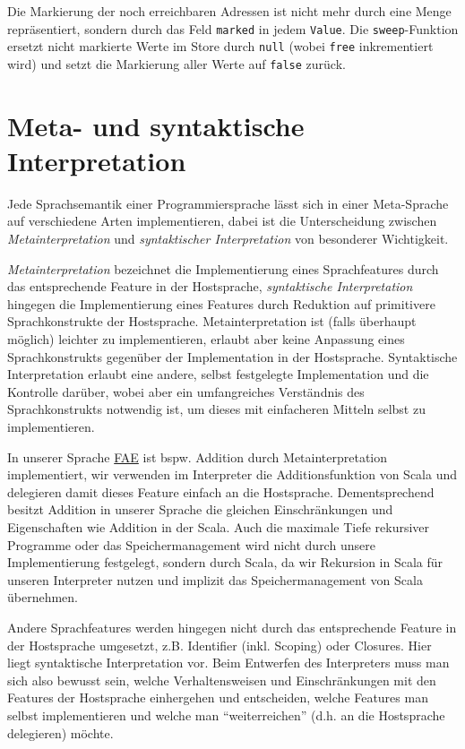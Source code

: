 \documentclass[]{article}
\begin{document}
Die Markierung der noch erreichbaren Adressen ist nicht mehr durch eine
Menge repräsentiert, sondern durch das Feld \texttt{marked} in jedem
\texttt{Value}. Die \texttt{sweep}-Funktion ersetzt nicht markierte
Werte im Store durch \texttt{null} (wobei \texttt{free} inkrementiert
wird) und setzt die Markierung aller Werte auf \texttt{false} zurück.

\hypertarget{meta--und-syntaktische-interpretation}{%
\section{Meta- und syntaktische
Interpretation}\label{meta--und-syntaktische-interpretation}}

Jede Sprachsemantik einer Programmiersprache lässt sich in einer
Meta-Sprache auf verschiedene Arten implementieren, dabei ist die
Unterscheidung zwischen \emph{Metainterpretation} und
\emph{syntaktischer Interpretation} von besonderer Wichtigkeit.

\emph{Metainterpretation} bezeichnet die Implementierung eines
Sprachfeatures durch das entsprechende Feature in der Hostsprache,
\emph{syntaktische Interpretation} hingegen die Implementierung eines
Features durch Reduktion auf primitivere Sprachkonstrukte der
Hostsprache. Metainterpretation ist (falls überhaupt möglich) leichter
zu implementieren, erlaubt aber keine Anpassung eines Sprachkonstrukts
gegenüber der Implementation in der Hostsprache. Syntaktische
Interpretation erlaubt eine andere, selbst festgelegte Implementation
und die Kontrolle darüber, wobei aber ein umfangreiches Verständnis des
Sprachkonstrukts notwendig ist, um dieses mit einfacheren Mitteln selbst
zu implementieren.

In unserer Sprache \protect\hyperlink{higher-order-funktionen-fae}{FAE}
ist bspw. Addition durch Metainterpretation implementiert, wir verwenden
im Interpreter die Additionsfunktion von Scala und delegieren damit
dieses Feature einfach an die Hostsprache. Dementsprechend besitzt
Addition in unserer Sprache die gleichen Einschränkungen und
Eigenschaften wie Addition in der Scala. Auch die maximale Tiefe
rekursiver Programme oder das Speichermanagement wird nicht durch unsere
Implementierung festgelegt, sondern durch Scala, da wir Rekursion in
Scala für unseren Interpreter nutzen und implizit das Speichermanagement
von Scala übernehmen.

Andere Sprachfeatures werden hingegen nicht durch das entsprechende
Feature in der Hostsprache umgesetzt, z.B. Identifier (inkl. Scoping)
oder Closures. Hier liegt syntaktische Interpretation vor. Beim
Entwerfen des Interpreters muss man sich also bewusst sein, welche
Verhaltensweisen und Einschränkungen mit den Features der Hostsprache
einhergehen und entscheiden, welche Features man selbst implementieren
und welche man ``weiterreichen'' (d.h. an die Hostsprache delegieren)
möchte.
\end{document}
